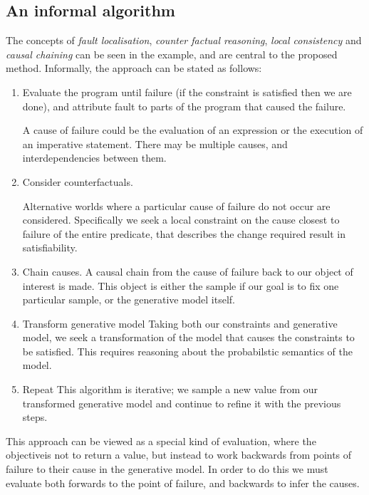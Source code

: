 \subsection{An informal algorithm}
The concepts of \textit{fault localisation}, \textit{counter factual reasoning}, \textit{local consistency} and \textit{causal chaining} can be seen in the example, and are central to the proposed method.
Informally, the approach can be stated as follows:
\begin{enumerate}
\item Evaluate the program until failure (if the constraint is satisfied then we are done), and attribute fault to parts of the program that caused the failure.

A cause of failure could be the evaluation of an expression or the execution of an imperative statement.
There may be multiple causes, and interdependencies between them.

\item Consider counterfactuals.

Alternative worlds where a particular cause of failure do not occur are considered.
Specifically we seek a local constraint on the cause closest to failure of the entire predicate, that describes the change required result in satisfiability.

\item Chain causes.
A causal chain from the cause of failure back to our object of interest is made.
This object is either the sample if our goal is to fix one particular sample, or the generative model itself.

\item Transform generative model
Taking both our constraints and generative model, we seek a transformation of the model that causes the constraints to be satisfied.
This requires reasoning about the probabilstic semantics of the model.

\item Repeat
This algorithm is iterative; we sample a new value from our transformed generative model and continue to refine it with the previous steps.

\end{enumerate}

This approach can be viewed as a special kind of evaluation, where the objectiveis not to return a value, but instead to work backwards from points of failure to their cause in the generative model.
In order to do this we must evaluate both forwards to the point of failure, and backwards to infer the causes.  

